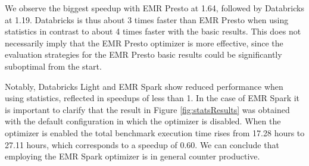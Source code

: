 We observe the biggest speedup with EMR Presto at 1.64, followed by Databricks at 1.19. Databricks is thus about 3 times faster than EMR Presto when using statistics in contrast to about 4 times faster with the basic results. This does not necessarily imply that the EMR Presto optimizer is more effective, since the evaluation strategies for the EMR Presto basic results could be significantly suboptimal from the start.

Notably, Databricks Light and EMR Spark show reduced performance when using statistics, reflected in speedups of less than 1. In the case of EMR Spark it is important to clarify that the result in Figure \ref{fig:statsResults} was obtained with the default configuration in which the optimizer is disabled. When the optimizer is enabled the total benchmark execution time rises from 17.28 hours to 27.11 hours, which corresponds to a speedup of 0.60. We can conclude that employing the EMR Spark optimizer is in general counter productive.








